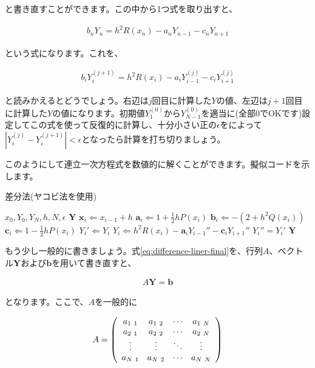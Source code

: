 \noindent
と書き直すことができます。この中から1つ式を取り出すと、

\begin{eqnarray}
    b_nY_n=h^2R(x_n)-a_nY_{n-1}-c_nY_{n+1}
\end{eqnarray}

\noindent
という式になります。これを、

\begin{eqnarray}
    b_iY_i^{(j+1)}=h^2R(x_i)-a_iY_{i-1}^{(j)}-c_iY_{i+1}^{(j)}
\end{eqnarray}

\noindent
と読みかえるとどうでしょう。右辺は$j$回目に計算した$Y$の値、左辺は$j+1$回目に計算した$Y$の値になります。初期値$Y_1^{(0)}$から$Y_{N-1}^{(0)}$を適当に(全部0でOKです)設定してこの式を使って反復的に計算し、十分小さい正の$\epsilon$をによって$|Y_i^{(j)}-Y_i^{(j+1)}|<\epsilon$となったら計算を打ち切りましょう。

このようにして連立一次方程式を数値的に解くことができます。擬似コードを示します。

\begin{algorithm}
\label{al:difference-jacobian}
\caption{差分法(ヤコビ法を使用)}
\begin{algorithmic}
\REQUIRE $x_0,Y_0,Y_N,h,N,\epsilon$
\ENSURE $\boldsymbol{Y}$
    \STATE $\boldsymbol{x}_i\Leftarrow x_{i-1}+h$
    \STATE $\boldsymbol{a}_i\Leftarrow 1+\frac{1}{2}hP(x_i)$
    \STATE $\boldsymbol{b}_i\Leftarrow -(2+h^2Q(x_i))$
    \STATE $\boldsymbol{c}_i\Leftarrow 1-\frac{1}{2}hP(x_i)$
\ENDFOR
{}
        \STATE $Y_i'\Leftarrow Y_i$
        \STATE $Y_i\Leftarrow h^2R(x_i)-\boldsymbol{a}_iY_{i-1}''-\boldsymbol{c}_iY_{i+1}''$
    \ENDFOR
        \STATE $Y_i''=Y_i'$
    \ENDFOR
\ENDWHILE
\RETURN $\boldsymbol{Y}$
\end{algorithmic}
\end{algorithm}


もう少し一般的に書きましょう。式\ref{eq:difference-liner-final}を、行列$A$、ベクトル$\boldsymbol{Y}$および$\boldsymbol{b}$を用いて書き直すと、

\begin{eqnarray}
    A\boldsymbol{Y}=\boldsymbol{b}
    \label{eq:coalition}
\end{eqnarray}

\noindent
となります。ここで、$A$を一般的に

\begin{eqnarray}
    A=\pqty{\begin{array}{cccc}
        a_{1\ 1} & a_{1\ 2} & \cdots & a_{1\ N} \\
        a_{2\ 1} & a_{2\ 2} & \cdots & a_{2\ N} \\
        \vdots & \vdots & \ddots & \vdots \\
        a_{N\ 1} & a_{N\ 2} & \cdots & a_{N\ N}
        \end{array}}
\end{eqnarray}

